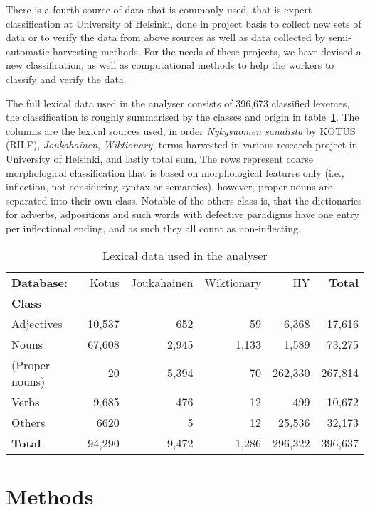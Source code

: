 \documentclass[a4paper,12pt]{article}
\begin{document}
There is a fourth source of data that is commonly used, that is expert
classification at University of Helsinki, done in project basis to collect
new sets of data or to verify the data from above sources as well as data
collected by semi-automatic harvesting methods. For the needs of
these projects, we have devised a new classification, as well as computational
methods to help the workers to classify and verify the data.

The full lexical data used in the analyser consists of 396,673 classified
lexemes, the classification is roughly summarised by the classes and origin in
table~\ref{table:lexical}. The columns are the lexical sources used, in order
\emph{Nykysuomen sanalista} by KOTUS (RILF), \emph{Joukahainen}, 
\emph{Wiktionary}, terms harvested in various research project in University of
Helsinki, and lastly total sum. The rows represent coarse morphological
classification that is based on morphological features only (i.e., inflection,
not considering syntax or semantics), however, proper nouns are separated into
their own class. Notable of the others class is, that the dictionaries for
adverbs, adpositions and such words with defective paradigms have one entry per
inflectional ending, and as such they all count as non-inflecting.

\begin{table}
  \centering
    \begin{tabular}{|l|r|r|r|r||r|}
        \hline
        \bf Database: & Kotus & Joukahainen & Wiktionary & HY & \bf Total \\
        \bf Class   & & & & & \\
        \hline
        Adjectives     & 10,537 & 652 & 59 & 6,368 & 17,616 \\
        Nouns          & 67,608 & 2,945 & 1,133 & 1,589 & 73,275\\
        (Proper nouns) & 20 & 5,394 & 70 & 262,330 & 267,814\\
        Verbs          & 9,685 & 476 & 12 & 499 & 10,672\\
        Others         & 6620 & 5 & 12 & 25,536 & 32,173 \\
        \hline
        \bf Total      & 94,290 & 9,472 & 1,286 & 296,322 & 396,637 \\
        \hline
    \end{tabular}
  \caption{Lexical data used in the analyser
  \label{table:lexical}}
\end{table}

\section{Methods}
\end{document}
